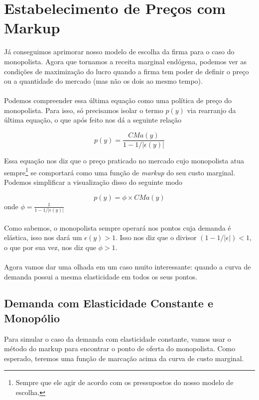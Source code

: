 \documentclass[a4paper,11pt,oneside]{book}
\theoremstyle{definition}
\theoremstyle{break}
\begin{document}
\section{Estabelecimento de Preços com Markup}

Já conseguimos aprimorar nosso modelo de escolha da firma para o caso do monopolista. Agora que tornamos a receita marginal endógena, podemos ver as condições de maximização do lucro quando a firma tem poder de definir o preço ou a quantidade do mercado (mas não os dois ao mesmo tempo).
\\~\\
Podemos compreender essa última equação como uma política de preço do monopolista. Para isso, só precisamos isolar o termo $p(y)$ via rearranjo da última equação, o que após feito nos dá a seguinte relação

$$ p(y) = \frac{CMa(y)}{1 - 1/|\epsilon(y)|} $$

Essa equação nos diz que o preço praticado no mercado cujo monopolista atua sempre\footnote{Sempre que ele agir de acordo com os pressupostos do nosso modelo de escolha.} se comportará como uma função de \textit{markup} do seu custo marginal. Podemos simplificar a visualização disso do seguinte modo

$$ p(y) = \phi \times CMa(y) $$
onde $\phi = \frac{1}{1 - 1/|\epsilon(y)|}$
\\~\\
Como sabemos, o monopolista sempre operará nos pontos cuja demanda é elástica, isso nos dará um $\epsilon(y) > 1$. Isso nos diz que o divisor $(1 - 1/|\epsilon|) <  1$, o que por sua vez, nos diz que $\phi > 1$.
\\~\\
Agora vamos dar uma olhada em um caso muito interessante: quando a curva de demanda possui a mesma elasticidade em todos os seus pontos.

\subsection{Demanda com Elasticidade Constante e Monopólio}

Para simular o caso da demanda com elasticidade constante, vamos usar o método do markup para encontrar o ponto de oferta do monopolista. Como esperado, teremos uma função de marcação acima da curva de custo marginal.
\end{document}
